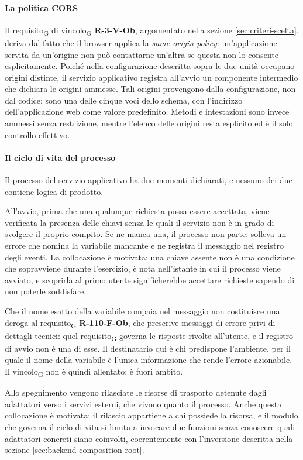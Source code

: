 \documentclass[a4paper, 10pt]{article}
\begin{document}
\paragraph{La politica CORS}
Il requisito\textsubscript{G} di vincolo\textsubscript{G} \textbf{R-3-V-Ob}, argomentato nella sezione \ref{sec:criteri-scelta}, deriva dal fatto che il browser applica la \textit{same-origin policy}: un'applicazione servita da un'origine non può contattarne un'altra se questa non lo consente esplicitamente. Poiché nella configurazione descritta sopra le due unità occupano origini distinte, il servizio applicativo registra all'avvio un componente intermedio che dichiara le origini ammesse. Tali origini provengono dalla configurazione, non dal codice: sono una delle cinque voci dello schema, con l'indirizzo dell'applicazione web come valore predefinito. Metodi e intestazioni sono invece ammessi senza restrizione, mentre l'elenco delle origini resta esplicito ed è il solo controllo effettivo.

\paragraph{Il ciclo di vita del processo}
Il processo del servizio applicativo ha due momenti dichiarati, e nessuno dei due contiene logica di prodotto.

All'avvio, prima che una qualunque richiesta possa essere accettata, viene verificata la presenza delle chiavi senza le quali il servizio non è in grado di svolgere il proprio compito. Se ne manca una, il processo non parte: solleva un errore che nomina la variabile mancante e ne registra il messaggio nel registro degli eventi. La collocazione è motivata: una chiave assente non è una condizione che sopravviene durante l'esercizio, è nota nell'istante in cui il processo viene avviato, e scoprirla al primo utente significherebbe accettare richieste sapendo di non poterle soddisfare.

Che il nome esatto della variabile compaia nel messaggio non costituisce una deroga al requisito\textsubscript{G} \textbf{R-110-F-Ob}, che prescrive messaggi di errore privi di dettagli tecnici: quel requisito\textsubscript{G} governa le risposte rivolte all'utente, e il registro di avvio non è una di esse. Il destinatario qui è chi predispone l'ambiente, per il quale il nome della variabile è l'unica informazione che rende l'errore azionabile. Il vincolo\textsubscript{G} non è quindi allentato: è fuori ambito.

Allo spegnimento vengono rilasciate le risorse di trasporto detenute dagli adattatori verso i servizi esterni, che vivono quanto il processo. Anche questa collocazione è motivata: il rilascio appartiene a chi possiede la risorsa, e il modulo che governa il ciclo di vita si limita a invocare due funzioni senza conoscere quali adattatori concreti siano coinvolti, coerentemente con l'inversione descritta nella sezione \ref{sec:backend-composition-root}.
\end{document}
